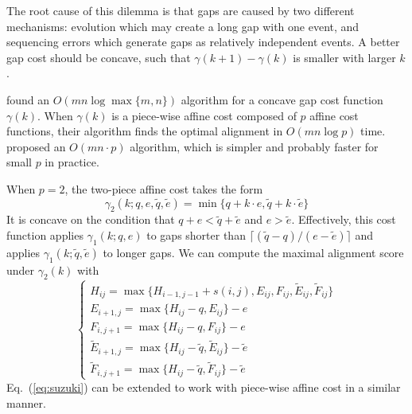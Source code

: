 \documentclass{bioinfo}
\begin{document}
\begin{methods}
The root cause of this dilemma is that gaps are caused by two different
mechanisms: evolution which may create a long gap with one event, and
sequencing errors which generate gaps as relatively independent events. A
better gap cost should be concave, such that $\gamma(k+1)-\gamma(k)$ is smaller
with larger $k$.

\citet{Miller:1988aa} found an $O(mn\log\max\{m,n\})$ algorithm for a concave
gap cost function $\gamma(k)$. When $\gamma(k)$ is a piece-wise affine cost
composed of $p$ affine cost functions, their algorithm finds the optimal
alignment in $O(mn\log p)$ time. \citet{Gotoh:1990aa} proposed an $O(mn\cdot
p)$ algorithm, which is simpler and probably faster for small $p$ in practice.

When $p=2$, the two-piece affine cost takes the form
\[
\gamma_2(k;q,e,\tilde{q},\tilde{e})=\min\{q+k\cdot e,\tilde{q}+k\cdot\tilde{e}\}
\]
It is concave on the condition that $q+e<\tilde{q}+\tilde{e}$ and
$e>\tilde{e}$. Effectively, this cost function applies $\gamma_1(k;q,e)$ to
gaps shorter than $\lceil(\tilde{q}-q)/(e-\tilde{e})\rceil$ and applies
$\gamma_1(k;\tilde{q},\tilde{e})$ to longer gaps. We can compute the maximal
alignment score under $\gamma_2(k)$ with
\begin{equation}\label{eq:affine2}
\left\{\begin{array}{l}
H_{ij} = \max\{H_{i-1,j-1}+s(i,j),E_{ij},F_{ij},\tilde{E}_{ij},\tilde{F}_{ij}\}\\
E_{i+1,j}= \max\{H_{ij}-q,E_{ij}\}-e\\
F_{i,j+1}= \max\{H_{ij}-q,F_{ij}\}-e\\
\tilde{E}_{i+1,j}= \max\{H_{ij}-\tilde{q},\tilde{E}_{ij}\}-\tilde{e}\\
\tilde{F}_{i,j+1}= \max\{H_{ij}-\tilde{q},\tilde{F}_{ij}\}-\tilde{e}
\end{array}\right.
\end{equation}
Eq.~(\ref{eq:suzuki}) can be extended to work with piece-wise affine cost in a
similar manner.

\end{methods}


\end{document}
